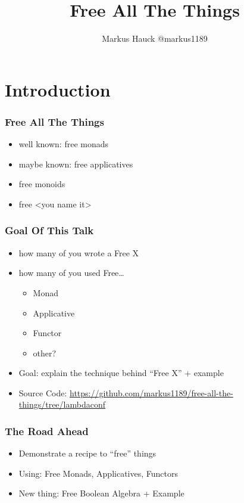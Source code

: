 \documentclass{beamer}
\title{Free All The Things}
\author{Markus Hauck @markus1189}
\begin{document}
\begin{frame}
  \titlepage{}
\end{frame}

\section{Introduction}\label{sec:introduction}

\begin{frame}
\frametitle{Free All The Things}
\begin{itemize}
\item well known: free monads
\item maybe known: free applicatives
\item free monoids
\item free <you name it>
\end{itemize}
\end{frame}

\begin{frame}
  \frametitle{Goal Of This Talk}
  \begin{itemize}
  \item how many of you wrote a Free X
  \item how many of you used Free\ldots
    \begin{itemize}
    \item Monad
    \item Applicative
    \item Functor
    \item other?
    \end{itemize}
  \item Goal: explain the technique behind ``Free X'' + example
  \item Source Code: \url{https://github.com/markus1189/free-all-the-things/tree/lambdaconf}
  \end{itemize}
\end{frame}

\begin{frame}
  \frametitle{The Road Ahead}
  \begin{itemize}
  \item Demonstrate a recipe to ``free'' things
  \item Using: Free Monads, Applicatives, Functors
  \item New thing: Free Boolean Algebra + Example
  \end{itemize}
\end{frame}
\end{document}
